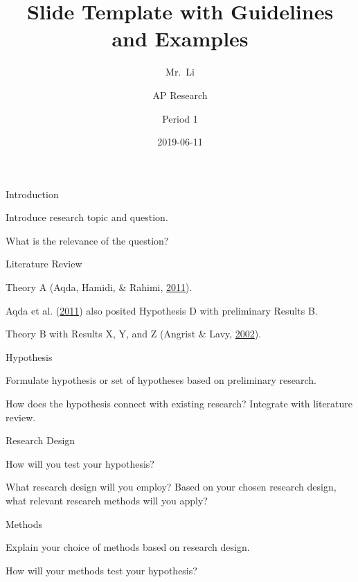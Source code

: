 \documentclass[
  ignorenonframetext,
]{beamer}
\title{Slide Template with Guidelines and Examples}
\author{Mr.~Li \and AP Research \and Period 1}
\date{2019-06-11}
\begin{document}
\frame{\titlepage}

\begin{frame}{Introduction}
\protect\hypertarget{introduction}{}

Introduce research topic and question.

What is the relevance of the question?

\end{frame}

\begin{frame}{Literature Review}
\protect\hypertarget{literature-review}{}

Theory A (Aqda, Hamidi, \& Rahimi,
\protect\hyperlink{ref-Aqda11}{2011}).

Aqda et al. (\protect\hyperlink{ref-Aqda11}{2011}) also posited
Hypothesis D with preliminary Results B.

Theory B with Results X, Y, and Z (Angrist \& Lavy,
\protect\hyperlink{ref-Angrist02}{2002}).

\end{frame}

\begin{frame}{Hypothesis}
\protect\hypertarget{hypothesis}{}

Formulate hypothesis or set of hypotheses based on preliminary research.

How does the hypothesis connect with existing research? Integrate with
literature review.

\end{frame}

\begin{frame}{Research Design}
\protect\hypertarget{research-design}{}

How will you test your hypothesis?

What research design will you employ? Based on your chosen research
design, what relevant research methods will you apply?

\end{frame}

\begin{frame}{Methods}
\protect\hypertarget{methods}{}

Explain your choice of methods based on research design.

How will your methods test your hypothesis?

\end{frame}
\end{document}
